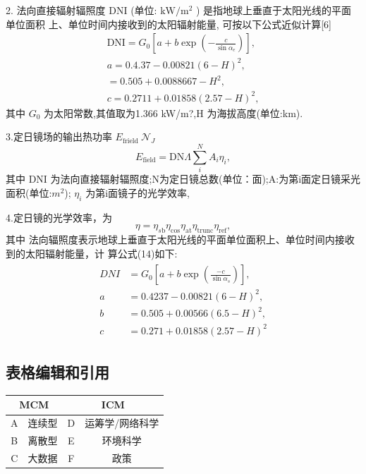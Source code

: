 \documentclass[a4paper,12pt]{article}
\begin{document}
    2. 法向直接辐射辐照度 DNI (单位: \(\mathrm{kW} / \mathrm{m}^{2}\) ) 是指地球上垂直于太阳光线的平面单位面积
    上、单位时间内接收到的太阳辐射能量, 可按以下公式近似计算[6]
    $$
	\begin{array}{c}
        {\mathrm{DNI}=G_{0}\left[a+b\exp\left(-\frac{c}{\sin\alpha_{e}}\right)\right],}\\ 
        {a=0.4.37-0.00821(6-H)^{2},}\\ {=0.505+0.0088667-H^{2},}\\ 
        {c=0.2711+0.01858(2.57-H)^{2},}\end{array}
	$$
    其中
    $G_{\mathrm{0}}$ 
    为太阳常数,其值取为1.366 kW/m?,H 为海拔高度(单位:km).
    
    3.定日镜场的输出热功率
    $E_{\mathrm{frield}}\ {\mathcal{N}}_{J}$ 
    $$
        E_{\mathrm{field}}=\mathrm{DN}\Lambda\sum_{i}^{N}A_{i}\eta_{i},
	$$
    其中 DNI 为法向直接辐射辐照度;N为定日镜总数(单位：面);A:为第i面定日镜采光
	面积(单位:$m^{2}$);
	$\eta_{i}$ 
    为第i面镜子的光学效率,
    
    4.定日镜的光学效率，为
	$$
	    \eta=\eta_{s\mathrm{b}}\eta_{\mathrm{cos}}\eta_{\mathrm{at}}\eta_{\mathrm{trunc}}\eta_{\mathrm{ref}},
	$$
    其中
	法向辐照度表示地球上垂直于太阳光线的平面单位面积上、单位时间内接收到的太阳辐射能量，计
	算公式(14)如下:
	$$
    \begin{align}
        \begin{split}
        D N I &= G_{0}\left[a + b \exp\left(\frac{-c}{\sin \alpha_{s}}\right)\right], \\
        a &= 0.4237 - 0.00821(6 - H)^{2}, \\
        b &= 0.505 + 0.00566(6.5 - H)^{2}, \\
        c &= 0.271 + 0.01858(2.57 - H)^{2}
        \end{split}
        \end{align}        
    $$

\subsection{表格编辑和引用}
    \begin{tabular}{|c|c|c|c|}
        \hline
        \multicolumn{2}{|c|}{MCM} & \multicolumn{2}{|c|}{ICM} \\
        \hline
        A & 连续型 & D & 运筹学/网络科学\\
        \hline
        B & 离散型 & E & 环境科学\\
        \hline
        C & 大数据 & F & 政策\\
        \hline
    \end{tabular}
    
\end{document}
